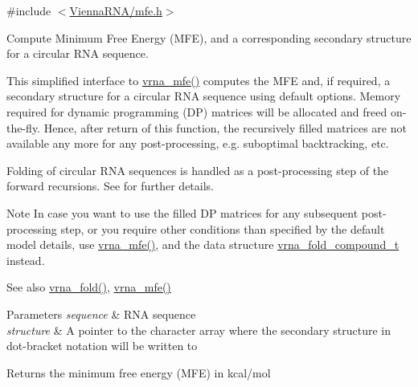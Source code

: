 {\ttfamily \#include $<$\mbox{\hyperlink{mfe_8h}{Vienna\+R\+N\+A/mfe.\+h}}$>$}



Compute Minimum Free Energy (M\+FE), and a corresponding secondary structure for a circular R\+NA sequence. 

This simplified interface to \mbox{\hyperlink{group__mfe__global_gabd3b147371ccf25c577f88bbbaf159fd}{vrna\+\_\+mfe()}} computes the M\+FE and, if required, a secondary structure for a circular R\+NA sequence using default options. Memory required for dynamic programming (DP) matrices will be allocated and free\textquotesingle{}d on-\/the-\/fly. Hence, after return of this function, the recursively filled matrices are not available any more for any post-\/processing, e.\+g. suboptimal backtracking, etc.

Folding of circular R\+NA sequences is handled as a post-\/processing step of the forward recursions. See \cite{hofacker:2006} for further details.

\begin{DoxyNote}{Note}
In case you want to use the filled DP matrices for any subsequent post-\/processing step, or you require other conditions than specified by the default model details, use \mbox{\hyperlink{group__mfe__global_gabd3b147371ccf25c577f88bbbaf159fd}{vrna\+\_\+mfe()}}, and the data structure \mbox{\hyperlink{group__fold__compound_ga1b0cef17fd40466cef5968eaeeff6166}{vrna\+\_\+fold\+\_\+compound\+\_\+t}} instead.
\end{DoxyNote}
\begin{DoxySeeAlso}{See also}
\mbox{\hyperlink{group__mfe__global_ga29a33b2895f4e67b0480271ff289afdc}{vrna\+\_\+fold()}}, \mbox{\hyperlink{group__mfe__global_gabd3b147371ccf25c577f88bbbaf159fd}{vrna\+\_\+mfe()}}
\end{DoxySeeAlso}

\begin{DoxyParams}{Parameters}
{\em sequence} & R\+NA sequence \\
\hline
{\em structure} & A pointer to the character array where the secondary structure in dot-\/bracket notation will be written to \\
\hline
\end{DoxyParams}
\begin{DoxyReturn}{Returns}
the minimum free energy (M\+FE) in kcal/mol 
\end{DoxyReturn}
\mbox{\label{group__mfe__global_ga6c9d3bef3e92c6d423ffac9f981418c1}} 
